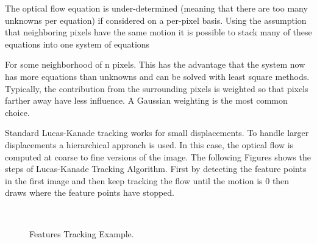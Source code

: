 The optical flow equation is under-determined (meaning that there are too many unknowns per equation) if considered on a per-pixel basis. Using the assumption that neighboring pixels have the same motion it is possible to stack many of these equations into one system of equations\bigskip

For some neighborhood of n pixels. This has the advantage that the system now has more equations than unknowns and can be solved with least square methods. Typically, the contribution from the surrounding pixels is weighted so that pixels farther away have less influence. A Gaussian weighting is the most common choice.\bigskip

Standard Lucas-Kanade tracking works for small displacements. To handle larger displacements a hierarchical approach is used. In this case, the optical flow is computed at coarse to fine versions of the image. The following Figures shows the steps of Lucas-Kanade Tracking Algorithm. First by detecting the feature points in the first image and then keep tracking the flow until the motion is 0 then draws where the feature points have stopped. \bigskip

\begin{figure}[h]
\begin{dBox}
\centering
  \mbox{
   }
   \caption{Features Tracking Example.\label{fig:dynamic121314} }   
\end{dBox}   
\end{figure}


